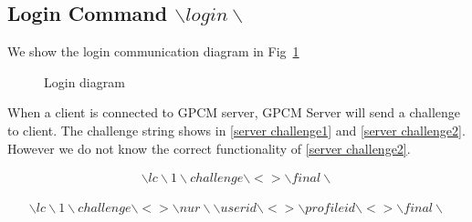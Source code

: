 \documentclass[oneside,titlepage,a4paper]{Definition/retrospy} %
\begin{document}
\subsection{Login Command $ \backslash login \backslash $}
We show the login communication diagram in Fig~\ref{Login diagram}
\begin{figure}[H]
	
\caption{Login diagram}
\label{Login diagram}
\end{figure}

When a client is connected to GPCM server, GPCM Server will send a challenge to client. The challenge string shows in \ref{server challenge1} and \ref{server challenge2}. However we do not know the correct functionality of \ref{server challenge2}.
\begin{tcolorbox}
	\begin{equation}\label{server challenge1}
	\begin{split}
	\backslash lc \backslash 1 \backslash challenge \backslash < > \backslash final \backslash
	\end{split}
	\end{equation}
\end{tcolorbox}
\begin{tcolorbox}
	\begin{equation}\label{server challenge2}
	\begin{split}
	\backslash lc \backslash 1 \backslash challenge \backslash < > 	\backslash nur \backslash\backslash userid \backslash < > \backslash profileid \backslash < > \backslash final \backslash
	\end{split}
	\end{equation}
\end{tcolorbox}
\end{document}
